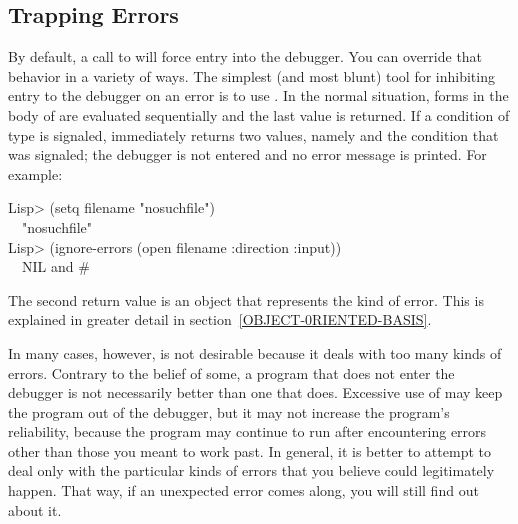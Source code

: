 \subsection{Trapping Errors}
\label{TRAPPING-ERRORS}

By default, a call to  will force entry into the debugger.  You can
override that behavior in a variety of ways. The simplest (and most blunt)
tool for inhibiting entry to the debugger on an error is to use .
In the normal situation, forms in the body of  are evaluated
sequentially and the last value is returned. If a condition of type  is
signaled,  immediately returns two values, namely  and the
condition that was signaled; the debugger is not entered and no error
message is printed. For example:
\begin{lisp}
Lisp> (setq filename "nosuchfile") \\
~\EV\ "nosuchfile" \\
Lisp> (ignore-errors (open filename :direction :input)) \\
~\EV\ NIL {\rm and} \#<FILE-ERROR 3437523>
\end{lisp}
The second return value is an object that represents the kind of error. This
is explained in greater detail in section~\ref{OBJECT-0RIENTED-BASIS}.

In many cases, however,  is not desirable because it deals with
too many kinds of errors. Contrary to the belief of some, a program that
does not enter the debugger is not necessarily better than one that does.
Excessive use of  may keep the program out of the debugger, but it may
not increase the program's reliability, because the program may continue
to run after encountering errors other than those you meant to work past. In
general, it is better to attempt to deal only with the particular kinds of
errors that you believe could legitimately happen. That way, if an unexpected
error comes along, you will still find out about it.

